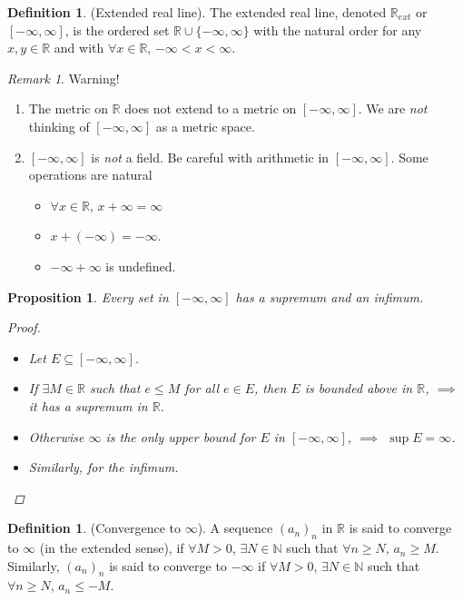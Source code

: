 \documentclass[10pt]{article}
\newcommand{\N}{\mathbb{N}}
\newcommand{\R}{\mathbb{R}}
\newtheorem{proposition}[theorem]{Proposition}
\theoremstyle{definition}
\newtheorem{definition}[theorem]{Definition}
\theoremstyle{remark}
\newtheorem*{remark}{Remark}
\begin{document}
\begin{definition}
    (Extended real line).
    The extended real line, denoted $\R_{ext}$ or $[-\infty, \infty]$, is the ordered set
    $\R \cup \{-\infty, \infty\}$ with the natural order for any $x, y \in \R$ and with
    $\forall x \in \R$, $-\infty < x < \infty$.
\end{definition}

\begin{remark}
    Warning!
    \begin{enumerate}
        \item The metric on $\R$ does not extend to a metric on $[-\infty, \infty]$.
            We are \textit{not} thinking of $[-\infty, \infty]$ as a metric space.
        \item $[-\infty, \infty]$ is \textit{not} a field. Be careful with arithmetic in $[-\infty, \infty]$. Some operations are natural
        \begin{itemize}
            \item $\forall x \in \R$, $x + \infty = \infty$
            \item $x + (-\infty) = -\infty$.
            \item $-\infty + \infty$ is undefined.
        \end{itemize}
    \end{enumerate}
\end{remark}

\begin{proposition}
    Every set in $[-\infty, \infty]$ has a supremum and an infimum.
    \begin{proof}
        \hfill
        \begin{itemize}
            \item Let $E \subseteq [-\infty, \infty]$.
            \item If $\exists M \in \R$ such that $e \leq M$ for all $e \in E$, then $E$ is bounded above in $\R$, $\implies$ it has a supremum in $\R$.
            \item Otherwise $\infty$ is the only upper bound for $E$ in $[-\infty, \infty]$, $\implies$ $\sup E = \infty$.
            \item Similarly, for the infimum.
        \end{itemize}
    \end{proof}
\end{proposition}

\begin{definition}
    (Convergence to $\infty$).
    A sequence $(a_n)_n$ in $\R$ is said to converge to $\infty$ (in the extended sense),
    if $\forall M > 0$, $\exists N \in \N$ such that $\forall n \geq N$, $a_n \geq M$.
    Similarly, $(a_n)_n$ is said to converge to $-\infty$ if $\forall M > 0$, $\exists N \in \N$ such that $\forall n \geq N$, $a_n \leq -M$.
\end{definition}
\end{document}

